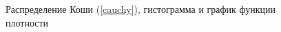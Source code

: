 \documentclass[12pt,a4paper]{article}
\begin{document}
\begin{figure}[h!]
\begin{minipage}[h]{0.3\linewidth}
		\end{minipage}
		\caption{Распределение Коши (\ref{cauchy}), гистограмма и график функции плотности}
		\label{ris:cauchy}
	\end{figure}
	
\end{document}
